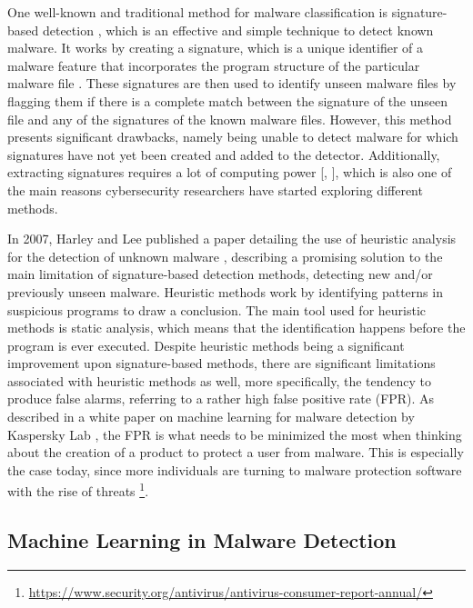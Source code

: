 \documentclass[11pt]{article}
\begin{document}
One well-known and traditional method for malware classification is signature-based detection \cite{kaspersky_ml_whitepaper}, which is an effective and simple technique to detect known malware. It works by creating a signature, which is a unique identifier of a malware feature that incorporates the program structure of the particular malware file \cite{8949524}. These signatures are then used to identify unseen malware files by flagging them if there is a complete match between the signature of the unseen file and any of the signatures of the known malware files. However, this method presents significant drawbacks, namely being unable to detect malware for which signatures have not yet been created and added to the detector. Additionally, extracting signatures requires a lot of computing power [\cite{inbook}, \cite{8949524}], which is also one of the main reasons cybersecurity researchers have started exploring different methods.

In 2007, Harley and Lee published a paper detailing the use of heuristic analysis for the detection of unknown malware \cite{eset_heuristic_analysis}, describing a promising solution to the main limitation of signature-based detection methods, detecting new and/or previously unseen malware. 
Heuristic methods work by identifying patterns in suspicious programs to draw a conclusion. The main tool used for heuristic methods is static analysis, which means that the identification happens before the program is ever executed. Despite heuristic methods being a significant improvement upon signature-based methods, there are significant limitations associated with heuristic methods as well, more specifically, the tendency to produce false alarms, referring to a rather high false positive rate (FPR). As described in a white paper on machine learning for malware detection by Kaspersky Lab \cite{kaspersky_ml_whitepaper}, the FPR is what needs to be minimized the most when thinking about the creation of a product to protect a user from malware. This is especially the case today, since more individuals are turning to malware protection software with the rise of threats \footnote{\href{https://www.security.org/antivirus/antivirus-consumer-report-annual/}{https://www.security.org/antivirus/antivirus-consumer-report-annual/}}. 


\subsection{Machine Learning in Malware Detection}
\end{document}
